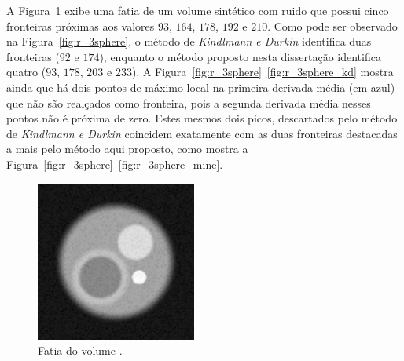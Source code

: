 	A Figura~\ref{fig:r_sphere_slice} exibe uma fatia de um volume sintético com ruido que possui cinco fronteiras próximas aos valores $ 93 $, $ 164 $, $ 178 $, $ 192 $ e $ 210 $. Como pode ser observado na Figura~\ref{fig:r_3sphere}, o método de \textit{Kindlmann e Durkin} identifica duas fronteiras ($ 92 $ e $ 174 $), enquanto o método proposto nesta dissertação identifica quatro ($ 93 $, $ 178 $, $ 203 $ e $ 233 $). A Figura~\ref{fig:r_3sphere}~\ref{fig:r_3sphere_kd} mostra ainda que há dois pontos de máximo local na primeira derivada média (em azul) que não são realçados como fronteira, pois a segunda derivada média nesses pontos não é próxima de zero. Estes mesmos dois picos, descartados pelo método de \textit{Kindlmann e Durkin} coincidem exatamente com as duas fronteiras destacadas a mais pelo método aqui proposto, como mostra a Figura~\ref{fig:r_3sphere}~\ref{fig:r_3sphere_mine}.
	
\begin{figure}[h]
	\centering
	\includegraphics[width=0.47\textwidth]{images/r_3sphere_slice}
	\caption{Fatia do volume .}
	\label{fig:r_sphere_slice}
\end{figure}


